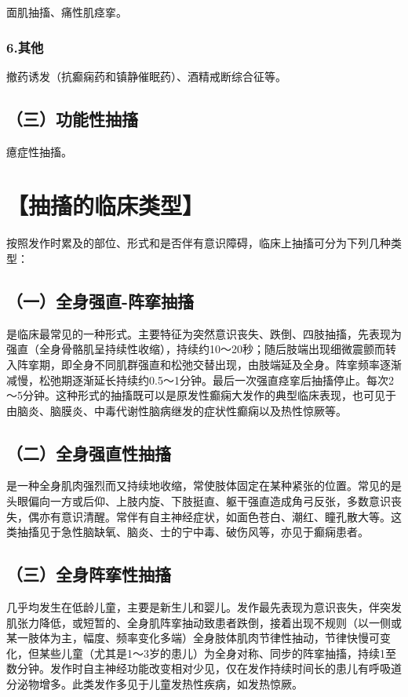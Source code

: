 面肌抽搐、痛性肌痉挛。

\subsubsection{6.其他}

撤药诱发（抗癫痫药和镇静催眠药）、酒精戒断综合征等。

\subsection{（三）功能性抽搐}

癔症性抽搐。

\section{【抽搐的临床类型】}

按照发作时累及的部位、形式和是否伴有意识障碍，临床上抽搐可分为下列几种类型：

\subsection{（一）全身强直-阵挛抽搐}

是临床最常见的一种形式。主要特征为突然意识丧失、跌倒、四肢抽搐，先表现为强直（全身骨骼肌呈持续性收缩），持续约10～20秒；随后肢端出现细微震颤而转入阵挛期，即全身不同肌群强直和松弛交替出现，由肢端延及全身。阵挛频率逐渐减慢，松弛期逐渐延长持续约0.5～1分钟。最后一次强直痉挛后抽搐停止。每次2～5分钟。这种形式的抽搐既可以是原发性癫痫大发作的典型临床表现，也可见于由脑炎、脑膜炎、中毒代谢性脑病继发的症状性癫痫以及热性惊厥等。

\subsection{（二）全身强直性抽搐}

是一种全身肌肉强烈而又持续地收缩，常使肢体固定在某种紧张的位置。常见的是头眼偏向一方或后仰、上肢内旋、下肢挺直、躯干强直造成角弓反张，多数意识丧失，偶亦有意识清醒。常伴有自主神经症状，如面色苍白、潮红、瞳孔散大等。这类抽搐见于急性脑缺氧、脑炎、士的宁中毒、破伤风等，亦见于癫痫患者。

\subsection{（三）全身阵挛性抽搐}

几乎均发生在低龄儿童，主要是新生儿和婴儿。发作最先表现为意识丧失，伴突发肌张力降低，或短暂的、全身肌阵挛抽动致患者跌倒，接着出现不规则（以一侧或某一肢体为主，幅度、频率变化多端）全身肢体肌肉节律性抽动，节律快慢可变化，但某些儿童（尤其是1～3岁的患儿）为全身对称、同步的阵挛抽搐，持续1至数分钟。发作时自主神经功能改变相对少见，仅在发作持续时间长的患儿有呼吸道分泌物增多。此类发作多见于儿童发热性疾病，如发热惊厥。

